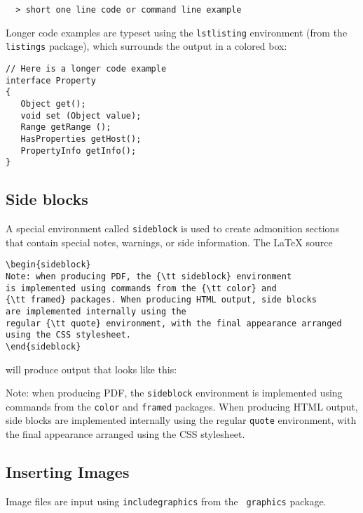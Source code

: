 \documentclass{article}
\begin{document}
\begin{verbatim}
  > short one line code or command line example
\end{verbatim}

Longer code examples are typeset using the {\tt lstlisting}
environment (from the {\tt listings} package), which surrounds
the output in a colored box:

\begin{lstlisting}
// Here is a longer code example
interface Property
{
   Object get(); 
   void set (Object value); 
   Range getRange ();
   HasProperties getHost();
   PropertyInfo getInfo();
}
\end{lstlisting}

\subsection{Side blocks}
\label{SideBlocksSec}

A special environment called {\tt sideblock} is used to create
admonition sections that contain special notes, warnings, or side
information. The LaTeX source

\begin{lstlisting}
\begin{sideblock}
Note: when producing PDF, the {\tt sideblock} environment
is implemented using commands from the {\tt color} and
{\tt framed} packages. When producing HTML output, side blocks
are implemented internally using the
regular {\tt quote} environment, with the final appearance arranged
using the CSS stylesheet. 
\end{sideblock}
\end{lstlisting}

will produce output that looks like this:

\begin{sideblock}
Note: when producing PDF, the {\tt sideblock} environment
is implemented using commands from the {\tt color} and
{\tt framed} packages. When producing HTML output, side blocks
are implemented internally using the
regular {\tt quote} environment, with the final appearance arranged
using the CSS stylesheet. 
\end{sideblock}

\subsection{Inserting Images}

Image files are input using {\tt \BKS includegraphics} from the {\tt
graphics} package. 
\end{document}
